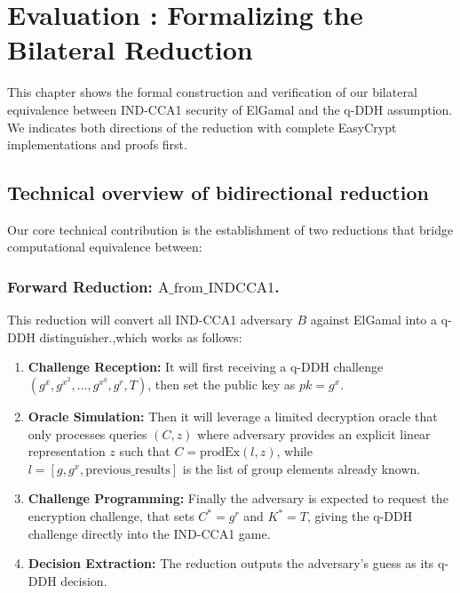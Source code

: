 
\chapter{Evaluation : Formalizing the Bilateral Reduction}
\label{sec:bilateral-reduction}

This chapter shows the formal construction and verification of our bilateral equivalence between IND-CCA1 security of ElGamal and the q-DDH assumption. We indicates both directions of the reduction with complete EasyCrypt implementations and proofs first.


\section{Technical overview of bidirectional reduction}
Our core technical contribution is the establishment of two reductions that bridge computational equivalence between:

\subsection{Forward Reduction: ${\text{A\_from\_INDCCA1}}$.} This reduction will convert all IND-CCA1 adversary $B$ against ElGamal into a q-DDH distinguisher.,which works as follows:
\begin{enumerate}
\item \textbf{Challenge Reception:} It will first receiving a q-DDH challenge $(g^x, g^{x^2}, \ldots, g^{x^q}, g^r, T)$, then set the public key as $pk = g^x$.
\item \textbf{Oracle Simulation:} Then it will leverage a limited decryption oracle that only processes queries $(C, z)$ where  adversary provides an explicit linear representation $z$ such that $C = \text{prodEx}(l, z)$, while $l = [g, g^x, \text{previous\_results}]$ is the list of group elements already known.
\item \textbf{Challenge Programming:} Finally the adversary is expected to request the encryption challenge, that sets $C^* = g^r$ and $K^* = T$, giving the q-DDH challenge directly into the IND-CCA1 game.
\item \textbf{Decision Extraction:} The reduction outputs the adversary's guess as its q-DDH decision.
\end{enumerate}

